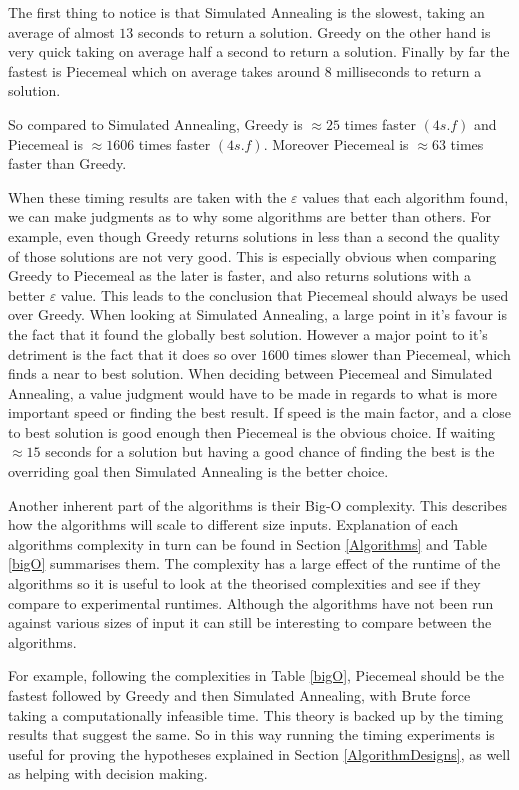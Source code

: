 \documentclass[12pt]{report}
\begin{document}
The first thing to notice is that Simulated Annealing is the slowest, taking an average of almost $13$ seconds to return a solution. Greedy on the other hand is very quick taking on average half a second to return a solution. Finally by far the fastest is Piecemeal which on average takes around $8$ milliseconds to return a solution.

So compared to Simulated Annealing, Greedy is $\approx 25$ times faster $(4 s.f)$ and Piecemeal is $\approx 1606$ times faster $(4 s.f)$. Moreover Piecemeal is $\approx 63$ times faster than Greedy.

When these timing results are taken with the $\varepsilon$ values that each algorithm found, we can make judgments as to why some algorithms are better than others. For example, even though Greedy returns solutions in less than a second the quality of those solutions are not very good. This is especially obvious when comparing Greedy to Piecemeal as the later is faster, and also returns solutions with a better $\varepsilon$ value. This leads to the conclusion that Piecemeal should always be used over Greedy. When looking at Simulated Annealing, a large point in it's favour is the fact that it found the globally best solution. However a major point to it's detriment is the fact that it does so over $1600$ times slower than Piecemeal, which finds a near to best solution. When deciding between Piecemeal and Simulated Annealing, a value judgment would have to be made in regards to what is more important speed or finding the best result. If speed is the main factor, and a close to best solution is good enough then Piecemeal is the obvious choice. If waiting $\approx 15$ seconds for a solution but having a good chance of finding the best is the overriding goal then Simulated Annealing is the better choice.

Another inherent part of the algorithms is their Big-O complexity. This describes how the algorithms will scale to different size inputs. Explanation of each algorithms complexity in turn can be found in Section \ref{Algorithms} and Table \ref{bigO} summarises them. The complexity has a large effect of the runtime of the algorithms so it is useful to look at the theorised complexities and see if they compare to experimental runtimes. Although the algorithms have not been run against various sizes of input it can still be interesting to compare between the algorithms.

For example, following the complexities in Table \ref{bigO}, Piecemeal should be the fastest followed by Greedy and then Simulated Annealing, with Brute force taking a computationally infeasible time. This theory is backed up by the timing results that suggest the same. So in this way running the timing experiments is useful for proving the  hypotheses explained in Section \ref{AlgorithmDesigns}, as well as helping with decision making.
\end{document}
